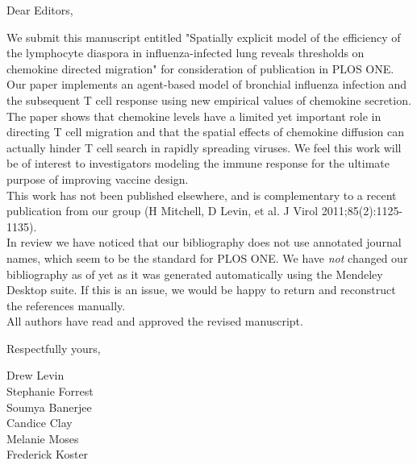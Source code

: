 \documentclass[10pt]{article}
\date{}
\begin{document}
\begin{flushleft}Dear Editors, \end{flushleft} 

We submit this manuscript entitled "Spatially explicit model of the efficiency of the lymphocyte diaspora in influenza-infected lung reveals thresholds on chemokine directed migration" for consideration of publication in PLOS ONE.  Our paper implements an agent-based model of bronchial influenza infection and the subsequent T cell response using new empirical values of chemokine secretion.  The paper shows that chemokine levels have a limited yet important role in directing T cell migration and that the spatial effects of chemokine diffusion can actually hinder T cell search in rapidly spreading viruses.  We feel this work will be of interest to investigators modeling the immune response for the ultimate purpose of improving vaccine design.
 \\

This work has not been published elsewhere, and is complementary to a recent publication from our group (H Mitchell, D Levin, et al. J Virol 2011;85(2):1125-1135). \\

In review we have noticed that our bibliography does not use annotated journal names, which seem to be the standard for PLOS ONE.  We have {\em not} changed our bibliography as of yet as it was generated automatically using the Mendeley Desktop suite.  If this is an issue, we would be happy to return and reconstruct the references manually. \\


All authors have read and approved the revised manuscript. 

\begin{flushleft}Respectfully yours,\end{flushleft}
Drew Levin \\
Stephanie Forrest \\
Soumya Banerjee \\
Candice Clay \\
Melanie Moses \\
Frederick Koster
\end{document}
